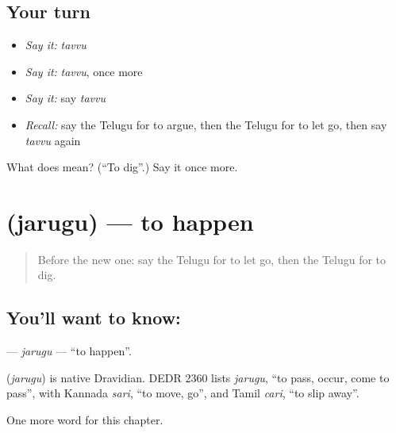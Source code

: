 \subsection*{Your turn}
\begin{itemize}
\raggedright
  \item \emph{Say it:} \emph{tavvu}
  \item \emph{Say it:} \emph{tavvu}, once more
  \item \emph{Say it:} say \emph{tavvu}
  \item \emph{Recall:} say the Telugu for to argue, then the Telugu for to let go, then say \emph{tavvu} again
\end{itemize}

\begin{tcolorbox}[breakable,colback=teal!4,colframe=teal!35!black,title={Before you move on}]
What does  mean? (\textquotedblleft{}To dig\textquotedblright{}.) Say it once more.
\end{tcolorbox}
\section[\texorpdfstring{\te{జరుగు} (jarugu)}{జరుగు (jarugu)}]{ (jarugu) — to happen}

\label{lesson:TE-C284-jarugu}



\begin{quote}
Before the new one: say the Telugu for to let go, then the Telugu for to dig.
\end{quote}

\subsection*{You'll want to know: }
\textbf{} — \emph{jarugu} — \textquotedblleft{}to happen\textquotedblright{}.

\begin{cousinweb}
\textbf{} (\emph{jarugu}) is native Dravidian. DEDR 2360 lists \emph{jarugu}, \textquotedblleft{}to pass, occur, come to pass\textquotedblright{}, with Kannada \emph{sari}, \textquotedblleft{}to move, go\textquotedblright{}, and Tamil \emph{cari}, \textquotedblleft{}to slip away\textquotedblright{}.
\end{cousinweb}

\begin{grammarlens}[title={What you've built}]
One more word for this chapter.
\end{grammarlens}

